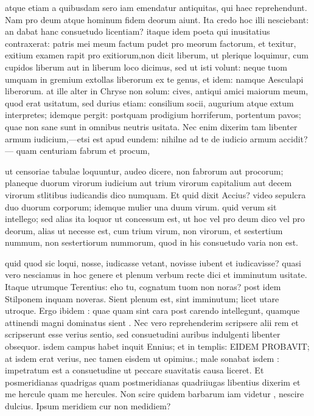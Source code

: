  atque etiam a quibusdam sero iam emendatur antiquitas, qui haec reprehendunt. Nam pro deum atque hominum fidem deorum aiunt. Ita credo hoc illi nesciebant: an dabat hanc consuetudo licentiam? itaque idem poeta qui inusitatius contraxerat: patris mei meum factum pudet pro meorum factorum, et texitur, exitium examen rapit pro exitiorum,non dicit liberum, ut plerique loquimur, cum cupidos liberum aut in liberum loco dicimus, sed ut isti volunt: neque tuom umquam in gremium extollas liberorum ex te genus, et idem: namque Aesculapi liberorum. at ille alter in Chryse non solum: cives, antiqui amici maiorum meum, quod erat usitatum, sed durius etiam: consilium socii, augurium atque extum interpretes; idemque pergit: postquam prodigium horriferum, portentum pavos; quae non sane sunt in omnibus neutris usitata. Nec enim dixerim tam libenter armum iudicium,—etsi est apud eundem: nihilne ad te de iudicio armum accidit?— quam centuriam fabrum et procum,

 ut censoriae tabulae loquuntur, audeo dicere, non fabrorum aut procorum; planeque duorum virorum iudicium aut trium virorum capitalium aut decem virorum stlitibus iudicandis dico numquam. Et quid dixit Accius? video sepulcra duo duorum corporum; idemque mulier una duum virum. quid verum sit intellego; sed alias ita loquor ut concessum est, ut hoc vel pro deum dico vel pro deorum, alias ut necesse est, cum trium virum, non virorum, et sestertium nummum, non sestertiorum nummorum, quod in his consuetudo varia non est.

 quid quod sic loqui, nosse, iudicasse vetant, novisse iubent et iudicavisse? quasi vero nesciamus in hoc genere et plenum verbum recte dici et imminutum usitate. Itaque utrumque Terentius: eho tu, cognatum tuom non noras? post idem Stilponem inquam noveras. Sient plenum est, sint imminutum; licet utare utroque. Ergo ibidem : quae quam sint cara post carendo intellegunt, quamque attinendi magni dominatus sient . Nec vero reprehenderim scripsere alii rem et scripserunt esse verius sentio, sed consuetudini auribus indulgenti libenter obsequor. isdem campus habet inquit Ennius; et in templis: EIDEM PROBAVIT; at isdem erat verius, nec tamen eisdem ut opimius.; male sonabat isdem : impetratum est a consuetudine ut peccare suavitatis causa liceret. Et posmeridianas quadrigas quam postmeridianas quadriiugas libentius dixerim et me hercule quam me hercules. Non scire quidem barbarum iam videtur , nescire dulcius. Ipsum meridiem cur non medidiem?

